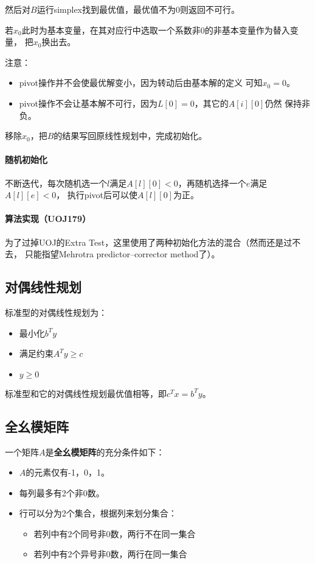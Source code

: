 然后对$B$运行simplex找到最优值，最优值不为0则返回不可行。

若$x_0$此时为基本变量，在其对应行中选取一个系数非0的非基本变量作为替入变量，
把$x_0$换出去。

注意：
\begin{itemize}
    \item pivot操作并不会使最优解变小，因为转动后由基本解的定义
    可知$x_0=0$。
    \item pivot操作不会让基本解不可行，因为$L[0]=0$，其它的$A[i][0]$仍然
    保持非负。
\end{itemize}

移除$x_0$，把$B$的结果写回原线性规划中，完成初始化。
\paragraph{随机初始化}
不断迭代，每次随机选一个$l$满足$A[l][0]<0$，再随机选择一个$e$满足$A[l][e]<0$，
执行pivot后可以使$A[l][0]$为正。
\paragraph{算法实现（UOJ179）}
为了过掉UOJ的Extra Test，这里使用了两种初始化方法的混合（然而还是过不去，
只能指望Mehrotra predictor–corrector method了）。

\subsection{对偶线性规划}
标准型的对偶线性规划为：
\begin{itemize}
    \item 最小化$b^Ty$
    \item 满足约束$A^Ty\geq c$
    \item $y\geq 0$
\end{itemize}

标准型和它的对偶线性规划最优值相等，即$c^Tx=b^Ty$。
\subsection{全幺模矩阵}


一个矩阵$A$是{\bfseries 全幺模矩阵}的充分条件如下：
\begin{itemize}
    \item $A$的元素仅有-1，0，1。
    \item 每列最多有2个非0数。
    \item 行可以分为2个集合，根据列来划分集合：
    \begin{itemize}
        \item 若列中有2个同号非0数，两行不在同一集合
        \item 若列中有2个异号非0数，两行在同一集合
    \end{itemize}
\end{itemize}

